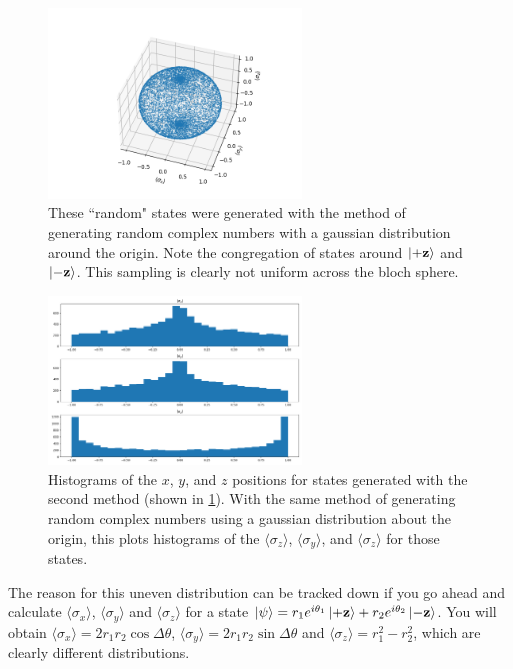 \documentclass{paper}[11pt]
\newcommand{\bv}[1]{\textbf{#1}}
\begin{document}
	\begin{figure}
		\centering
		\includegraphics[width=0.6\textwidth]{method1_random_states_bloch_sphere.png}
		\caption{These ``random" states were generated with the method of generating random complex numbers with a gaussian distribution around the origin. Note the congregation of states around $\ket{+\bv{z}}$ and $\ket{-\bv{z}}$. This sampling is clearly not uniform across the bloch sphere.}
		\label{fig:method1_pure_bloch_sphere}
	\end{figure}
	
	\begin{figure}
		\centering
		\includegraphics[width=0.6\textwidth]{method1_random_states_histograms.png}
		\caption{Histograms of the $x$, $y$, and $z$ positions for states generated with the second method (shown in \cref{fig:method1_pure_bloch_sphere}). With the same method of generating random complex numbers using a gaussian distribution about the origin, this plots histograms of the $\langle \sigma_z\rangle$, $\langle\sigma_y\rangle$, and $\langle\sigma_z\rangle$ for those states.}
		\label{fig:method1_pure_hists}
	\end{figure}
	
	The reason for this uneven distribution can be tracked down if you go ahead and calculate $\langle\sigma_x\rangle$, $\langle\sigma_y\rangle$ and $\langle\sigma_z\rangle$ for a state $\ket{\psi} = r_1e^{i\theta_1}\ket{+\bv{z}} + r_2e^{i\theta_2}\ket{-\bv{z}}$. You will obtain $\langle\sigma_x\rangle=2r_1r_2\cos\Delta\theta$, $\langle\sigma_y\rangle=2r_1r_2\sin\Delta\theta$ and $\langle\sigma_z\rangle=r_1^2-r_2^2$, which are clearly different distributions.
\end{document}
